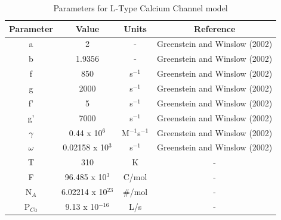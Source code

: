 \documentclass[12pt]{ucsddissertation}
\begin{document}
\begin{table}[h]
\centering
\caption{Parameters for Sodium-Calcium Exchanger (NCX) 
and Plasma Membrane Calcium-ATPase (PMCA) pump models}
\end{table}


\begin{table}[h]
\centering
\caption{Parameters for L-Type Calcium Channel model}
\begin{tabular}{cccc}
\hline
\textbf{Parameter} & \textbf{Value} & \textbf{Units} & \textbf{
Reference} \\
\hline
a & 2 & - & Greenstein and Winslow (2002) \\
\hline
b & 1.9356 & - & Greenstein and Winslow (2002) \\
\hline
f & 850 & s$^{-1}$ & Greenstein and Winslow (2002) \\
\hline
g & 2000 & s$^{-1}$ & Greenstein and Winslow (2002) \\
\hline
f' & 5 & s$^{-1}$ & Greenstein and Winslow (2002) \\
\hline
g' & 7000 & s$^{-1}$ & Greenstein and Winslow (2002) \\
\hline
$\gamma$ & 0.44 x 10$^{6}$ & M$^{-1}$s$^{-1}$ & Greenstein and 
Winslow (2002) \\
\hline
$\omega$ & 0.02158 x 10$^{3}$ & s$^{-1}$ & Greenstein and Winslow (2002) 
\\
\hline
T & 310 & K & - \\
\hline
F & 96.485 x 10$^{3}$ & C/mol & - \\
\hline
N$_{A}$ & 6.02214 x 10$^{23}$ & \#/mol & - \\
\hline
P$_{Ca}$ & 9.13 x 10$^{-16}$ & L/s & - \\
\hline
\end{tabular}
\end{table}
\end{document}

